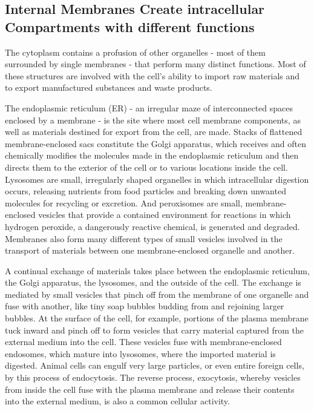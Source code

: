 \subsection{Internal Membranes Create intracellular Compartments with different functions}

The cytoplasm contains a profusion of other organelles - most of them surrounded
by single membranes - that perform many distinct functions. Most of these structures
are involved with the cell’s ability to import raw materials and to export
manufactured substances and waste products.

The endoplasmic reticulum (ER) - an irregular maze of interconnected
spaces enclosed by a membrane - is the site where most
cell membrane components, as well as materials destined for export
from the cell, are made. Stacks of flattened membrane-enclosed sacs
constitute the Golgi apparatus, which receives and often
chemically modifies the molecules made in the endoplasmic reticulum
and then directs them to the exterior of the cell or to various locations
inside the cell. Lysosomes are small, irregularly shaped organelles in
which intracellular digestion occurs, releasing nutrients from food particles
and breaking down unwanted molecules for recycling or excretion.
And peroxisomes are small, membrane-enclosed vesicles that provide a
contained environment for reactions in which hydrogen peroxide, a dangerously
reactive chemical, is generated and degraded. Membranes also
form many different types of small vesicles involved in the transport of
materials between one membrane-enclosed organelle and another.

A continual exchange of materials takes place between the endoplasmic
reticulum, the Golgi apparatus, the lysosomes, and the outside of the
cell. The exchange is mediated by small vesicles that pinch off from the
membrane of one organelle and fuse with another, like tiny soap bubbles
budding from and rejoining larger bubbles. At the surface of the cell, for
example, portions of the plasma membrane tuck inward and pinch off
to form vesicles that carry material captured from the external medium
into the cell. These vesicles fuse with membrane-enclosed
endosomes, which mature into lysosomes, where the imported material
is digested. Animal cells can engulf very large particles, or even entire
foreign cells, by this process of endocytosis. The reverse process, exocytosis,
whereby vesicles from inside the cell fuse with the plasma membrane
and release their contents into the external medium, is also a common
cellular activity.

